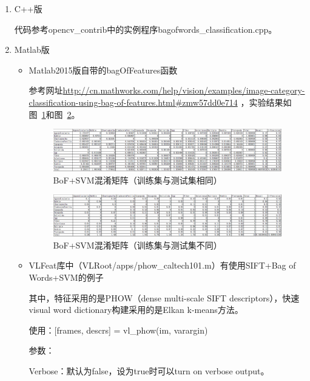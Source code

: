 \documentclass[12pt]{article}
\begin{document}
\begin{enumerate}

\item C++版

代码参考opencv\_contrib中的实例程序bagofwords\_classification.cpp。

\item Matlab版

\begin{itemize}

\item Matlab2015版自带的bagOfFeatures函数

参考网址\url{http://cn.mathworks.com/help/vision/examples/image-category-classification-using-bag-of-features.html#zmw57dd0e714} ，实验结果如图~\ref{fig:Train-CM-BoF-SVM-Linear}和图~\ref{fig:Test-CM-BoF-SVM-Linear}。

\begin{figure}[!ht]
\centering
\includegraphics[width=1.0\linewidth]{Train-CM-BoF-SVM-Linear}
\caption{BoF+SVM混淆矩阵（训练集与测试集相同）}
\label{fig:Train-CM-BoF-SVM-Linear}
\end{figure}

\begin{figure}[!ht]
\centering
\includegraphics[width=1.0\linewidth]{Test-CM-BoF-SVM-Linear}
\caption{BoF+SVM混淆矩阵（训练集与测试集不同）}
\label{fig:Test-CM-BoF-SVM-Linear}
\end{figure}

\item VLFeat库中（VLRoot/apps/phow\_caltech101.m）有使用SIFT+Bag of Words+SVM的例子

其中，特征采用的是PHOW（dense multi-scale SIFT descriptors），快速visual word dictionary构建采用的是Elkan k-means方法。

使用：[frames, descrs] = vl\_phow(im, varargin)

参数：

Verbose：默认为false，设为true时可以turn on verbose output。


\end{itemize}
\end{enumerate}
\end{document}
